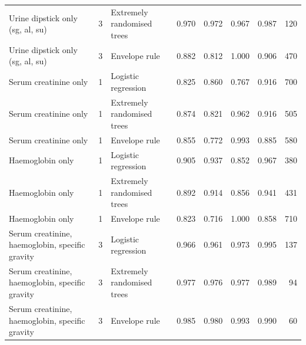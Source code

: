\begin{table}[!ht]
\begin{tabular}{p{4.6cm}rlrrrrr}
Urine dipstick only (sg, al, su) & 3 & Extremely randomised trees & 0.970 & 0.972 & 0.967 & 0.987 & 120\\
Urine dipstick only (sg, al, su) & 3 & Envelope rule & 0.882 & 0.812 & 1.000 & 0.906 & 470\\
Serum creatinine only & 1 & Logistic regression & 0.825 & 0.860 & 0.767 & 0.916 & 700\\
Serum creatinine only & 1 & Extremely randomised trees & 0.874 & 0.821 & 0.962 & 0.916 & 505\\
Serum creatinine only & 1 & Envelope rule & 0.855 & 0.772 & 0.993 & 0.885 & 580\\
Haemoglobin only & 1 & Logistic regression & 0.905 & 0.937 & 0.852 & 0.967 & 380\\
Haemoglobin only & 1 & Extremely randomised trees & 0.892 & 0.914 & 0.856 & 0.941 & 431\\
Haemoglobin only & 1 & Envelope rule & 0.823 & 0.716 & 1.000 & 0.858 & 710\\
Serum creatinine, haemoglobin, specific gravity & 3 & Logistic regression & 0.966 & 0.961 & 0.973 & 0.995 & 137\\
Serum creatinine, haemoglobin, specific gravity & 3 & Extremely randomised trees & 0.977 & 0.976 & 0.977 & 0.989 & 94\\
Serum creatinine, haemoglobin, specific gravity & 3 & Envelope rule & 0.985 & 0.980 & 0.993 & 0.990 & 60\\
\bottomrule\end{tabular}\end{table}

